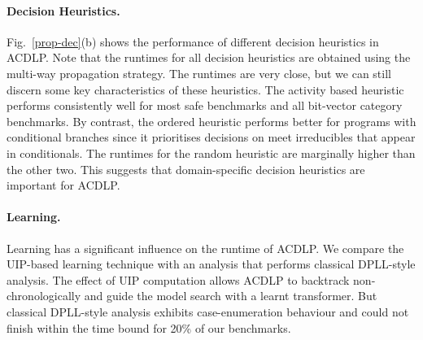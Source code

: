 \paragraph{Decision Heuristics.}
%
Fig.~\ref{prop-dec}(b) shows the performance of different decision
heuristics in ACDLP.  Note that the runtimes for all decision heuristics are
obtained using the multi-way propagation strategy.  The runtimes are very
close, but we can still discern some key characteristics of these
heuristics.  The activity based heuristic performs consistently well for most safe
benchmarks and all bit-vector category benchmarks.  By contrast, the ordered
heuristic performs better for programs with conditional branches since it
prioritises decisions on meet irreducibles that appear in conditionals.  The
runtimes for the random heuristic are marginally higher than the other
two.  This suggests that domain-specific decision heuristics are important
for ACDLP.
%

\paragraph{Learning.}
%
Learning has a significant influence on the runtime of ACDLP.  We compare
the UIP-based learning technique with an analysis that performs classical 
DPLL-style analysis.
The effect of UIP computation allows ACDLP to backtrack non-chronologically 
and guide the model search with a learnt transformer.  But classical 
DPLL-style analysis exhibits case-enumeration behaviour and could not finish 
within the time bound for 20\% of our benchmarks.
%
